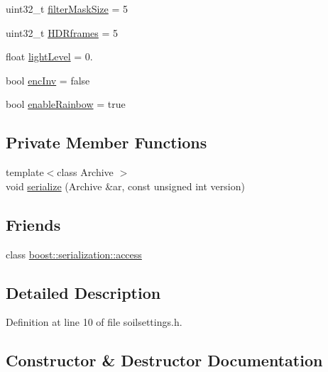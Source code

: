 \begin{DoxyCompactItemize}
\item 
uint32\+\_\+t \hyperlink{class_soil_analyzer_1_1_soil_settings_ad9d5071bbf6d10638df024e883c6199f}{filter\+Mask\+Size} = 5
\item 
uint32\+\_\+t \hyperlink{class_soil_analyzer_1_1_soil_settings_a77e631ff44efe74762b5adaa2eb2cd11}{H\+D\+Rframes} = 5
\item 
float \hyperlink{class_soil_analyzer_1_1_soil_settings_aa4d3ed8c1ab6551bfa4763e8a1ffc148}{light\+Level} = 0.
\item 
bool \hyperlink{class_soil_analyzer_1_1_soil_settings_ad831e13b61fc2097219bbf7252f045d5}{enc\+Inv} = false
\item 
bool \hyperlink{class_soil_analyzer_1_1_soil_settings_a9ece0b96eb8614a497fba3a19d8b4da1}{enable\+Rainbow} = true
\end{DoxyCompactItemize}
\subsection*{Private Member Functions}
\begin{DoxyCompactItemize}
\item 
{\footnotesize template$<$class Archive $>$ }\\void \hyperlink{class_soil_analyzer_1_1_soil_settings_ad52138eef4b72905cdaed60bed902646}{serialize} (Archive \&ar, const unsigned int version)
\end{DoxyCompactItemize}
\subsection*{Friends}
\begin{DoxyCompactItemize}
\item 
class \hyperlink{class_soil_analyzer_1_1_soil_settings_ac98d07dd8f7b70e16ccb9a01abf56b9c}{boost\+::serialization\+::access}
\end{DoxyCompactItemize}


\subsection{Detailed Description}


Definition at line 10 of file soilsettings.\+h.



\subsection{Constructor \& Destructor Documentation}
\hypertarget{class_soil_analyzer_1_1_soil_settings_ab8359b9a5ea27e6296e79a82789c8719}{}
